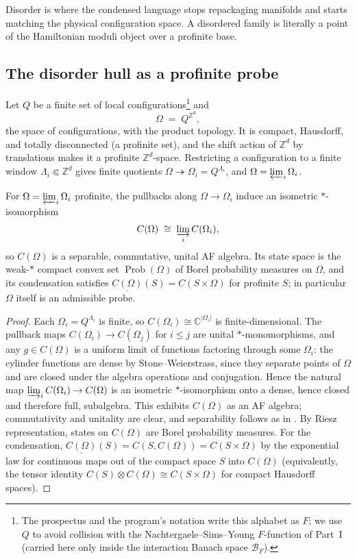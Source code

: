 \documentclass[12pt]{article}
\newcommand{\cond}[1]{\underline{#1}}          %
\newcommand{\BF}{\mathcal{B}_{F}}              %
\newcommand{\dis}{\Omega}                       %
\newcommand{\Prob}{\operatorname{Prob}}        %
\newcommand{\CC}{\mathbb{C}}
\newcommand{\ZZ}{\mathbb{Z}}
\newcommand{\abs}[1]{\lvert #1 \rvert}
\theoremstyle{plain}
\begin{document}
Disorder is where the condensed language stops repackaging manifolds and starts
matching the physical configuration space. A disordered family is literally a point
of the Hamiltonian moduli object over a profinite base.

\subsection{The disorder hull as a profinite probe}

Let $Q$ be a finite set of local configurations\footnote{The prospectus and the program's notation write this alphabet as $F$; we use $Q$ to avoid collision with the Nachtergaele--Sims--Young $F$-function of Part~I (carried here only inside the interaction Banach space $\BF$).} and
\[
  \dis \;=\; Q^{\ZZ^{d}},
\]
the space of configurations, with the product topology. It is compact, Hausdorff,
and totally disconnected (a profinite set), and the shift action of $\ZZ^{d}$ by
translations makes it a profinite $\ZZ^{d}$-space. Restricting a configuration to a
finite window $\Lambda_{i}\Subset\ZZ^{d}$ gives finite quotients
$\dis\twoheadrightarrow\dis_{i}=Q^{\Lambda_{i}}$, and $\dis=\varprojlim_{i}\dis_{i}$.

\begin{proposition}[$C(\dis)$ is a commutative AF algebra]
\label{prop:hullAF}
For $\dis=\varprojlim_{i}\dis_{i}$ profinite, the pullbacks along
$\dis\to\dis_{i}$ induce an isometric $\ast$-isomorphism
\[
  C(\dis) \;\cong\; \varinjlim_{i} C(\dis_{i}),
\]
so $C(\dis)$ is a separable, commutative, unital AF algebra. Its state space is the
weak-$\ast$ compact convex set $\Prob(\dis)$ of Borel probability measures on $\dis$,
and its condensation satisfies $\cond{C(\dis)}(S)=C(S\times\dis)$ for profinite $S$;
in particular $\dis$ itself is an admissible probe.
\end{proposition}

\begin{proof}
Each $\dis_{i}=Q^{\Lambda_{i}}$ is finite, so $C(\dis_{i})\cong\CC^{\abs{\dis_{i}}}$ is
finite-dimensional. The pullback maps $C(\dis_{i})\to C(\dis_{j})$ for $i\le j$ are
unital $\ast$-monomorphisms, and any $g\in C(\dis)$ is a uniform limit of functions
factoring through some $\dis_{i}$: the cylinder functions are dense by
Stone--Weierstrass, since they separate points of $\dis$ and are closed under the
algebra operations and conjugation. Hence the natural map
$\varinjlim_{i}C(\dis_{i})\to C(\dis)$ is an isometric $\ast$-isomorphism onto a
dense, hence closed and therefore full, subalgebra. This exhibits $C(\dis)$ as an AF
algebra; commutativity and unitality are clear, and separability follows as in
. By Riesz representation, states on $C(\dis)$ are Borel probability
measures. For the condensation, $\cond{C(\dis)}(S)=C(S,C(\dis))=C(S\times\dis)$ by the
exponential law for continuous maps out of the compact space $S$ into $C(\dis)$
(equivalently, the tensor identity $C(S)\otimes C(\dis)\cong C(S\times\dis)$ for
compact Hausdorff spaces).
\end{proof}
\end{document}
